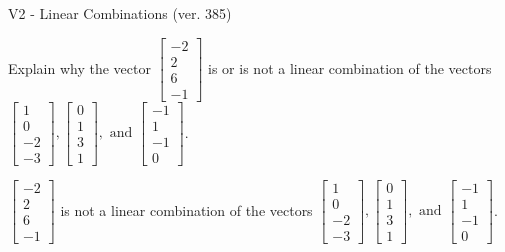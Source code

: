 \begin{exercise}
  \begin{exerciseTitle}V2 - Linear Combinations (ver. 385)\end{exerciseTitle}
  \begin{exerciseStatement}
    Explain why the vector \(\left[\begin{array}{c}
-2 \\
2 \\
6 \\
-1
\end{array}\right]\)  is or is not a linear 
	combination of the vectors \(\left[\begin{array}{c}
1 \\
0 \\
-2 \\
-3
\end{array}\right] , \left[\begin{array}{c}
0 \\
1 \\
3 \\
1
\end{array}\right] , \text{ and } \left[\begin{array}{c}
-1 \\
1 \\
-1 \\
0
\end{array}\right]\).
	


  \end{exerciseStatement}
  \begin{exerciseAnswer}
   \(\left[\begin{array}{c}
-2 \\
2 \\
6 \\
-1
\end{array}\right]\) 
  	 is not  
	a linear combination of the vectors \(\left[\begin{array}{c}
1 \\
0 \\
-2 \\
-3
\end{array}\right] , \left[\begin{array}{c}
0 \\
1 \\
3 \\
1
\end{array}\right] , \text{ and } \left[\begin{array}{c}
-1 \\
1 \\
-1 \\
0
\end{array}\right]\).

	
  


  \end{exerciseAnswer}
\end{exercise}